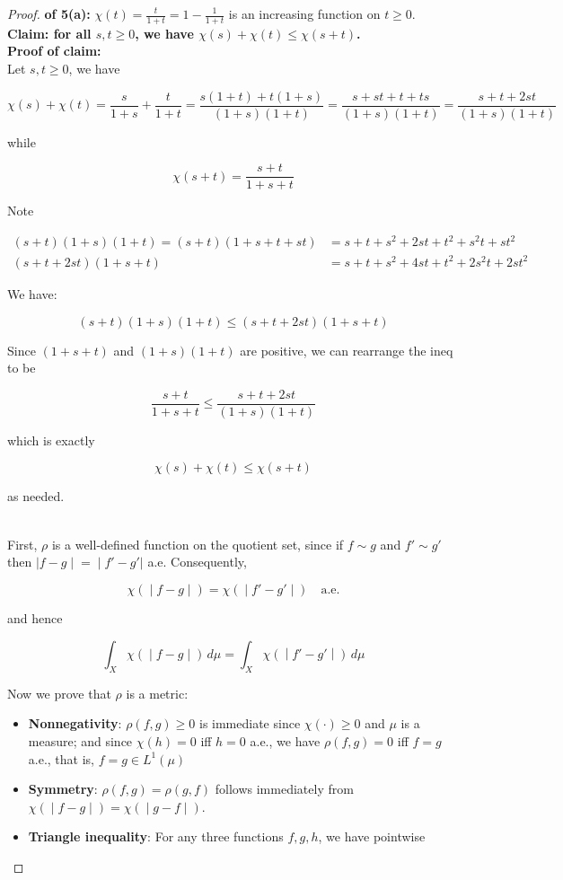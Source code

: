 \documentclass{qlnotes-export}
\begin{document}
\begin{proof}

\textbf{of 5(a):} \(\chi(t) = \frac{t}{1 + t} = 1 - \frac{1}{1 + t}\) is an increasing function on \(t \geq 0\).\\
\textbf{Claim: for all \(s,t \geq 0\), we have \(\chi(s) + \chi(t) \leq \chi(s + t)\).}\\
\textbf{Proof of claim:}\\
Let \(s,t \geq 0\), we have

\[\chi(s) + \chi(t) = \frac{s}{1 + s} + \frac{t}{1 + t} = \frac{s(1 + t) + t(1 + s)}{(1 + s)(1 + t)} = \frac{s + st + t + ts}{(1 + s)(1 + t)} = \frac{s + t + 2st}{(1 + s)(1 + t)}\]

while

\[\chi(s + t) = \frac{s + t}{1 + s + t}\]

Note

\[\begin{matrix}
{(s + t)(1 + s)(1 + t) = (s + t)(1 + s + t + st)} & {= s + t + s^{2} + 2st + t^{2} + s^{2}t + st^{2}} \\
{(s + t + 2st)(1 + s + t)} & {= s + t + s^{2} + 4st + t^{2} + 2s^{2}t + 2st^{2}}
\end{matrix}\]

We have:

\[(s + t)(1 + s)(1 + t) \leq (s + t + 2st)(1 + s + t)\]

Since \((1 + s + t)\) and \((1 + s)(1 + t)\) are positive, we can rearrange the ineq to be

\[\frac{s + t}{1 + s + t} \leq \frac{s + t + 2st}{(1 + s)(1 + t)}\]

which is exactly

\[\chi(s) + \chi(t) \leq \chi(s + t)\]

as needed.\\
\strut \\
First, \(\rho\) is a well-defined function on the quotient set, since if \(f \sim g\) and \(f' \sim g'\) then \(\left. |f - g \middle| = \middle| f' - g'| \right.\) a.e. Consequently,

\[\left. \chi( \middle| f - g \middle| ) = \chi( \middle| f' - g' \middle| )\quad\text{a.e.} \right.\]

and hence

\[\left. \int_{X}\chi( \middle| f - g \middle| )\, d\mu = \int_{X}\chi( \middle| f' - g' \middle| )\, d\mu \right.\]

Now we prove that \(\rho\) is a metric:

\begin{itemize}
\item
  \textbf{Nonnegativity}: \(\rho(f,g) \geq 0\) is immediate since \(\chi( \cdot ) \geq 0\) and \(\mu\) is a measure; and since \(\chi(h) = 0\) iff \(h = 0\) a.e., we have \(\rho(f,g) = 0\) iff \(f = g\) a.e., that is, \(f = g \in L^{1}(\mu)\)
\item
  \textbf{Symmetry}: \(\rho(f,g) = \rho(g,f)\) follows immediately from \(\left. \chi( \middle| f - g \middle| ) = \chi( \middle| g - f \middle| ) \right.\).
\item
  \textbf{Triangle inequality}: For any three functions \(f,g,h\), we have pointwise


\end{itemize}
\end{proof}
\end{document}
